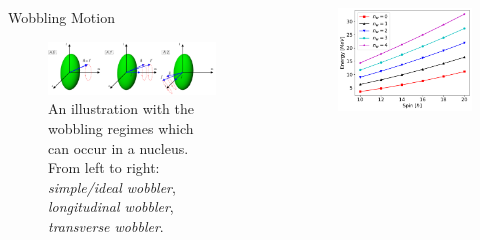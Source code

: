 \documentclass[final]{beamer}
\newlength{\sepwidth}
\newlength{\colwidth}
\newcommand{\separatorcolumn}{\begin{column}{\sepwidth}\end{column}}
\begin{document}
\begin{frame}[t]
\begin{columns}[t]
\begin{column}{\colwidth}
\begin{block}{Wobbling Motion}
  \begin{figure}
      \centering
      \includegraphics[scale=1.7]{images/wobbling_Regimes_COUPLING_SCHEME.pdf}
      \caption{An illustration with the wobbling regimes which can occur in a nucleus. From left to right: \emph{simple/ideal wobbler}, \emph{longitudinal wobbler}, \emph{transverse wobbler}.}
      \label{wobbling-regimes}
  \end{figure}
\end{block}
\end{column}
\separatorcolumn
\begin{column}{\colwidth}
 \begin{figure}
\centering
\begin{minipage}{.5\textwidth}
  \centering
  \includegraphics[scale=0.95]{images/simple_wobbling_spectrum.pdf}

\end{minipage}
\end{figure}
\end{column}
\end{columns}
\end{frame}
\end{document}
